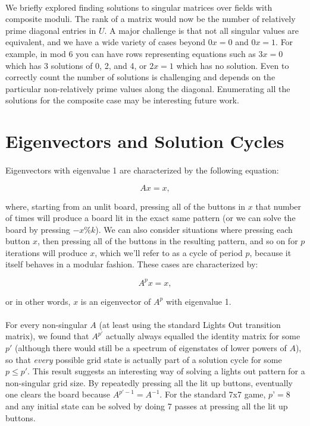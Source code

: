 \documentclass[11pt]{article}
\begin{document}
\paragraph{} We briefly explored finding solutions to singular matrices over fields with composite moduli.  The rank of a matrix would now be the number of relatively prime diagonal entries in $U$.  A major challenge is that not all singular values are equivalent, and we have a wide variety of cases beyond $0x = 0$ and $0x =1$.  For example, in mod 6 you can have rows representing equations such as $3x = 0$ which has 3 solutions of 0, 2, and 4, or $2x = 1$ which has no solution.  Even to correctly count the number of solutions is challenging and depends on the particular non-relatively prime values along the diagonal.  Enumerating all the solutions for the composite case may be interesting future work.

\section*{Eigenvectors and Solution Cycles}

\paragraph{} Eigenvectors with eigenvalue 1 are characterized by the following equation:

\begin{equation}
Ax = x,
\end{equation}

\noindent where, starting from an unlit board, pressing all of the buttons in $x$ that number of times will produce a board lit in the exact same pattern (or we can solve the board by pressing $-x \% k$). We can also consider situations where pressing each button $x$, then pressing all of the buttons in the resulting pattern, and so on for $p$ iterations will produce $x$, which we'll refer to as a cycle of period $p$, because it itself behaves in a modular fashion. These cases are characterized by:

\begin{equation}
A^px = x,
\end{equation}

\noindent or in other words, $x$ is an eigenvector of $A^p$ with eigenvalue 1.

\paragraph{} For every non-singular $A$ (at least using the standard Lights Out transition matrix), we found that $A^{p'}$ actually always equalled the identity matrix for some $p'$ (although there would still be a spectrum of eigenstates of lower powers of $A$), so that \textit{every} possible grid state is actually part of a solution cycle for some $p \leq p'$.  This result suggests an interesting way of solving a lights out pattern for a non-singular grid size.  By repeatedly pressing all the lit up buttons, eventually one clears the board because $A^{p' - 1} = A^{-1}$.  For the standard 7x7 game, $p’ = 8$ and any initial state can be solved by doing 7 passes at pressing all the lit up buttons.
\end{document}
